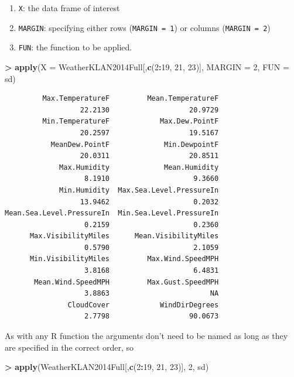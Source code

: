 \documentclass[]{krantz}
\makeatletter
\newenvironment{Shaded}{\begin{snugshade}}{\end{snugshade}}
\newcommand{\KeywordTok}[1]{\textcolor[rgb]{0.27,0.27,0.27}{\textbf{#1}}}
\newcommand{\DataTypeTok}[1]{\textcolor[rgb]{0.27,0.27,0.27}{#1}}
\newcommand{\DecValTok}[1]{\textcolor[rgb]{0.06,0.06,0.06}{#1}}
\newcommand{\StringTok}[1]{\textcolor[rgb]{0.5,0.5,0.5}{#1}}
\newcommand{\OperatorTok}[1]{\textcolor[rgb]{0.43,0.43,0.43}{\textbf{#1}}}
\newcommand{\NormalTok}[1]{#1}
\providecommand{\tightlist}{%
  \setlength{\itemsep}{0pt}\setlength{\parskip}{0pt}}
\newenvironment{kframe}{%
\medskip{}
\setlength{\fboxsep}{.8em}
 \def\at@end@of@kframe{}%
 \ifinner\ifhmode%
  \def\at@end@of@kframe{\end{minipage}}%
  \begin{minipage}{\columnwidth}%
 \fi\fi%
 \def\FrameCommand##1{\hskip\@totalleftmargin \hskip-\fboxsep
 \colorbox{shadecolor}{##1}\hskip-\fboxsep
     \hskip-\linewidth \hskip-\@totalleftmargin \hskip\columnwidth}%
 \MakeFramed {\advance\hsize-\width
   \@totalleftmargin\z@ \linewidth\hsize
   \@setminipage}}%
 {\par\unskip\endMakeFramed%
 \at@end@of@kframe}
\renewenvironment{Shaded}{\begin{kframe}}{\end{kframe}}
\makeatother
\begin{document}
\begin{enumerate}
\def\labelenumi{\arabic{enumi}.}
\tightlist
\item
  \texttt{X}: the data frame of interest
\item
  \texttt{MARGIN}: specifying either rows (\texttt{MARGIN\ =\ 1}) or
  columns (\texttt{MARGIN\ =\ 2})
\item
  \texttt{FUN}: the function to be applied.
\end{enumerate}

\begin{Shaded}
\begin{Highlighting}[]
\OperatorTok{>}\StringTok{ }\KeywordTok{apply}\NormalTok{(}\DataTypeTok{X =}\NormalTok{ WeatherKLAN2014Full[,}\KeywordTok{c}\NormalTok{(}\DecValTok{2}\OperatorTok{:}\DecValTok{19}\NormalTok{, }\DecValTok{21}\NormalTok{, }\DecValTok{23}\NormalTok{)], }\DataTypeTok{MARGIN =} \DecValTok{2}\NormalTok{, }\DataTypeTok{FUN =}\NormalTok{ sd)}
\end{Highlighting}
\end{Shaded}

\begin{verbatim}
         Max.TemperatureF         Mean.TemperatureF 
                  22.2130                   20.9729 
         Min.TemperatureF            Max.Dew.PointF 
                  20.2597                   19.5167 
           MeanDew.PointF             Min.DewpointF 
                  20.0311                   20.8511 
             Max.Humidity             Mean.Humidity 
                   8.1910                    9.3660 
             Min.Humidity  Max.Sea.Level.PressureIn 
                  13.9462                    0.2032 
Mean.Sea.Level.PressureIn  Min.Sea.Level.PressureIn 
                   0.2159                    0.2360 
      Max.VisibilityMiles      Mean.VisibilityMiles 
                   0.5790                    2.1059 
      Min.VisibilityMiles         Max.Wind.SpeedMPH 
                   3.8168                    6.4831 
       Mean.Wind.SpeedMPH         Max.Gust.SpeedMPH 
                   3.8863                        NA 
               CloudCover            WindDirDegrees 
                   2.7798                   90.0673 
\end{verbatim}

As with any R function the arguments don't need to be named as long as
they are specified in the correct order, so

\begin{Shaded}
\begin{Highlighting}[]
\OperatorTok{>}\StringTok{ }\KeywordTok{apply}\NormalTok{(WeatherKLAN2014Full[,}\KeywordTok{c}\NormalTok{(}\DecValTok{2}\OperatorTok{:}\DecValTok{19}\NormalTok{, }\DecValTok{21}\NormalTok{, }\DecValTok{23}\NormalTok{)], }\DecValTok{2}\NormalTok{, sd)}
\end{Highlighting}
\end{Shaded}
\end{document}
